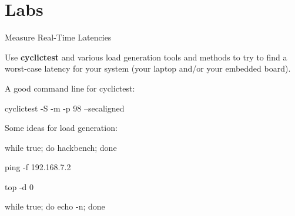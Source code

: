 \clearpage\section{Labs}\begin{Lab}

\begin{exe} {Measure Real-Time Latencies}

   Use \textbf{cyclictest} and various load generation
   tools and methods to try to find a worst-case
   latency for your system (your laptop and/or your
   embedded board).

   A good command line for cyclictest:
   \begin{raw}
cyclictest -S -m -p 98 --secaligned
   \end{raw}

   Some ideas for load generation:
   \begin{raw}
while true; do hackbench; done
   \end{raw}
   \begin{raw}
ping -f 192.168.7.2
   \end{raw}
   \begin{raw}
top -d 0
   \end{raw}
   \begin{raw}
while true; do echo -n; done
   \end{raw}
\end{exe}

\end{Lab}
